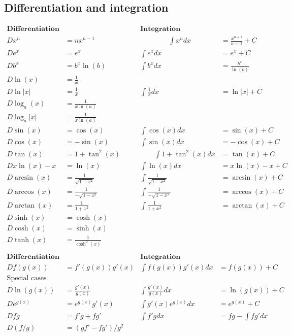 \documentclass[12pt]{article}
\begin{document}
\subsection*{Differentiation and integration}

$$
\begin{array}{rl|rl}
\textbf{Differentiation} && \textbf{Integration}&\\[2mm]
Dx^n&=nx^{n-1}     \qquad\qquad&\qquad\qquad\int x^ndx&=\frac{x^{n+1}}{n+1}+C \\[2mm]
De^x&=e^x &\int e^xdx&=e^x+C\\[2mm]
Db^x&=b^x\ln(b) & \int b^xdx&=\frac{b^x}{\ln(b)}\\[2mm]
D\ln(x)&=\frac{1}{x} &&\\[2mm]
D\ln|x|&=\frac{1}{x} &\int\frac{1}{x}dx&=\ln|x|+C\\[2mm]
D\log_a(x)&=\frac{1}{x\ln(a)} &&\\[2mm]
D\log_a|x|&=\frac{1}{x\ln(a)} &&\\[2mm]
D\sin(x)&=\cos(x)   &\int\cos(x)dx&=\sin(x)+C\\[2mm]
D\cos(x)&=-\sin(x)  &\int\sin(x)dx&=-\cos(x)+C\\[2mm]
D\tan(x)&=1+\tan^2(x) \qquad&\qquad\int 1+\tan^2(x)dx&=\tan(x)+C\\[2mm]

Dx\ln(x)-x&=\ln(x) & \int\ln(x)dx&=x\ln(x)-x+C\\[10mm]

D\arcsin(x)&=\frac{1}{\sqrt{1-x^2}} & \int\frac{1}{\sqrt{1-x^2}}&=\arcsin(x)+C\\
D\arccos(x)&=\frac{1}{-\sqrt{1-x^2}} & \int\frac{1}{-\sqrt{1-x^2}}&=\arccos(x)+C\\
D\arctan(x)&=\frac{1}{1+x^2} & \int\frac{1}{1+x^2}&=\arctan(x)+C\\

D\sinh(x)&=\cosh(x) &&\\
D\cosh(x)&=\sinh(x) &&\\
D\tanh(x)&=\frac{1}{\cosh^2(x)} &&\\
\end{array}  
$$
\vspace{1cm}
$$
\begin{array}{rl|rl}
\textbf{Differentiation} && \textbf{Integration}&\\[2mm]
D f(g(x))&=f'(g(x))g'(x) & \int f(g(x))g'(x)dx&=f(g(x))+C\\[2mm]
\textrm{Special cases} &&&\\
D\ln(g(x))&=\frac{g'(x)}{g(x)} & \int \frac{g'(x)}{g(x)}dx&=\ln(g(x))+C\\[2mm]
D e^{g(x)}&=e^{g(x)}g'(x) & \int g'(x)e^{g(x)}dx&=e^{g(x)}+C\\[10mm]
D fg&=f'g+fg'& \int f'g dx&=fg-\int fg'dx\\[2mm]
D (f/g)&=(gf'-fg')/g^2 &&\\[2mm]
\end{array}  
$$
\end{document}
